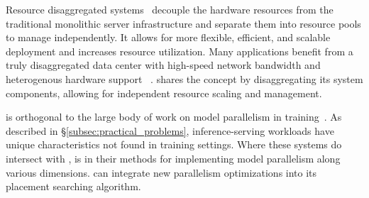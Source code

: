  Resource disaggregated systems~\cite{shan2018legoos,mira,CXL} decouple the hardware resources from the traditional monolithic server infrastructure and separate them into resource pools to manage independently. It allows for more flexible, efficient, and scalable deployment and increases resource utilization. Many applications benefit from a truly disaggregated data center with high-speed network bandwidth and heterogenous hardware support ~\cite{makeitreal,audibert2022case, distmind}. \sys shares the concept by disaggregating its system components, allowing for independent resource scaling and management.


 \sys is orthogonal to the large body of work on model parallelism in training~\cite{alpa,shoeybi2020megatronlm,huang2019gpipe,rajbhandari2020zero,pipedream}. As described in \S\ref{subsec:practical_problems}, inference-serving workloads have unique characteristics not found in training settings. Where these systems do intersect with \sys, is in their methods for implementing model parallelism along various dimensions. \sys can integrate new parallelism optimizations into its placement searching algorithm.
